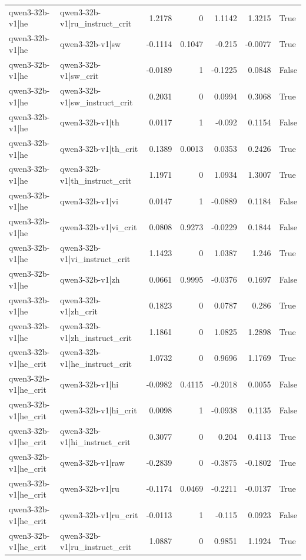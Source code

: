 \begin{table}
\begin{tabular}{l l r r r r l}
qwen3-32b-v1|he & qwen3-32b-v1|ru_instruct_crit & 1.2178 & 0 & 1.1142 & 1.3215 & True \\
qwen3-32b-v1|he & qwen3-32b-v1|sw & -0.1114 & 0.1047 & -0.215 & -0.0077 & True \\
qwen3-32b-v1|he & qwen3-32b-v1|sw_crit & -0.0189 & 1 & -0.1225 & 0.0848 & False \\
qwen3-32b-v1|he & qwen3-32b-v1|sw_instruct_crit & 0.2031 & 0 & 0.0994 & 0.3068 & True \\
qwen3-32b-v1|he & qwen3-32b-v1|th & 0.0117 & 1 & -0.092 & 0.1154 & False \\
qwen3-32b-v1|he & qwen3-32b-v1|th_crit & 0.1389 & 0.0013 & 0.0353 & 0.2426 & True \\
qwen3-32b-v1|he & qwen3-32b-v1|th_instruct_crit & 1.1971 & 0 & 1.0934 & 1.3007 & True \\
qwen3-32b-v1|he & qwen3-32b-v1|vi & 0.0147 & 1 & -0.0889 & 0.1184 & False \\
qwen3-32b-v1|he & qwen3-32b-v1|vi_crit & 0.0808 & 0.9273 & -0.0229 & 0.1844 & False \\
qwen3-32b-v1|he & qwen3-32b-v1|vi_instruct_crit & 1.1423 & 0 & 1.0387 & 1.246 & True \\
qwen3-32b-v1|he & qwen3-32b-v1|zh & 0.0661 & 0.9995 & -0.0376 & 0.1697 & False \\
qwen3-32b-v1|he & qwen3-32b-v1|zh_crit & 0.1823 & 0 & 0.0787 & 0.286 & True \\
qwen3-32b-v1|he & qwen3-32b-v1|zh_instruct_crit & 1.1861 & 0 & 1.0825 & 1.2898 & True \\
qwen3-32b-v1|he_crit & qwen3-32b-v1|he_instruct_crit & 1.0732 & 0 & 0.9696 & 1.1769 & True \\
qwen3-32b-v1|he_crit & qwen3-32b-v1|hi & -0.0982 & 0.4115 & -0.2018 & 0.0055 & False \\
qwen3-32b-v1|he_crit & qwen3-32b-v1|hi_crit & 0.0098 & 1 & -0.0938 & 0.1135 & False \\
qwen3-32b-v1|he_crit & qwen3-32b-v1|hi_instruct_crit & 0.3077 & 0 & 0.204 & 0.4113 & True \\
qwen3-32b-v1|he_crit & qwen3-32b-v1|raw & -0.2839 & 0 & -0.3875 & -0.1802 & True \\
qwen3-32b-v1|he_crit & qwen3-32b-v1|ru & -0.1174 & 0.0469 & -0.2211 & -0.0137 & True \\
qwen3-32b-v1|he_crit & qwen3-32b-v1|ru_crit & -0.0113 & 1 & -0.115 & 0.0923 & False \\
qwen3-32b-v1|he_crit & qwen3-32b-v1|ru_instruct_crit & 1.0887 & 0 & 0.9851 & 1.1924 & True \\

\end{tabular}
\end{table}
